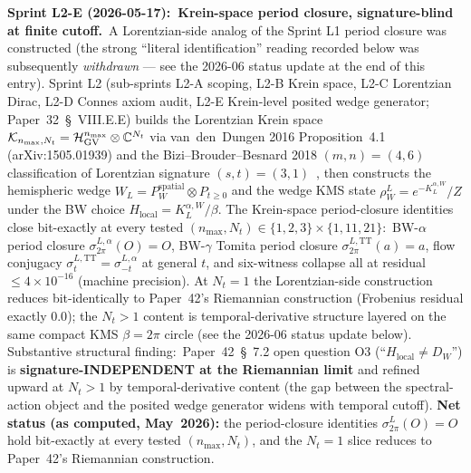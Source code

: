 \documentclass[11pt]{article}
\begin{document}
\textbf{Sprint L2-E (2026-05-17):\ Krein-space period closure,
signature-blind at finite cutoff.}\ A Lorentzian-side analog of
the Sprint L1 period closure was constructed (the strong
``literal identification'' reading recorded below was subsequently
\emph{withdrawn} --- see the 2026-06 status update at the end of this
entry).
Sprint L2 (sub-sprints L2-A scoping, L2-B Krein space, L2-C Lorentzian
Dirac, L2-D Connes axiom audit, L2-E Krein-level posited wedge generator;
Paper~32~\S~VIII.E.E) builds the Lorentzian Krein space
$\mathcal{K}_{n_{\max}, N_t} = \mathcal{H}_{\rm GV}^{n_{\max}} \otimes
\mathbb{C}^{N_t}$ via van~den~Dungen 2016 Proposition~4.1
(arXiv:1505.01939) and the Bizi--Brouder--Besnard 2018
$(m, n) = (4, 6)$ classification of Lorentzian signature
$(s, t) = (3, 1)$~\cite{bizi_brouder_besnard2018}, then constructs the
hemispheric wedge $W_L = P_W^{\mathrm{spatial}} \otimes P_{t \geq 0}$
and the wedge KMS state $\rho_W^L = e^{-K_L^{\alpha, W}}/Z$ under the
BW choice $H_{\mathrm{local}} = K_L^{\alpha, W}/\beta$.  The
Krein-space period-closure identities close bit-exactly at
every tested $(n_{\max}, N_t) \in \{1, 2, 3\} \times \{1, 11, 21\}$:\
BW-$\alpha$ period closure $\sigma_{2\pi}^{L, \alpha}(O) = O$, BW-$\gamma$
Tomita period closure $\sigma_{2\pi}^{L, \mathrm{TT}}(a) = a$, flow
conjugacy $\sigma_t^{L, \mathrm{TT}} = \sigma_{-t}^{L, \alpha}$ at
general $t$, and six-witness collapse all at residual $\leq 4 \times
10^{-16}$ (machine precision).  At $N_t = 1$ the Lorentzian-side
construction reduces bit-identically to Paper~42's Riemannian
construction (Frobenius residual exactly $0.0$); the $N_t > 1$ content
is temporal-derivative structure layered on the same compact KMS
$\beta = 2\pi$ circle (see the 2026-06 status update below).
Substantive structural finding:\ Paper~42~\S~7.2 open
question O3 (``$H_{\mathrm{local}} \neq D_W$'') is
\textbf{signature-INDEPENDENT at the Riemannian limit} and refined
upward at $N_t > 1$ by temporal-derivative content (the gap between
the spectral-action object and the posited wedge generator
widens with temporal cutoff).  \textbf{Net status (as computed, May~2026):} the period-closure
identities $\sigma_{2\pi}^{L}(O) = O$ hold bit-exactly at every tested
$(n_{\max}, N_t)$, and the $N_t = 1$ slice reduces to Paper~42's
Riemannian construction.
\end{document}

